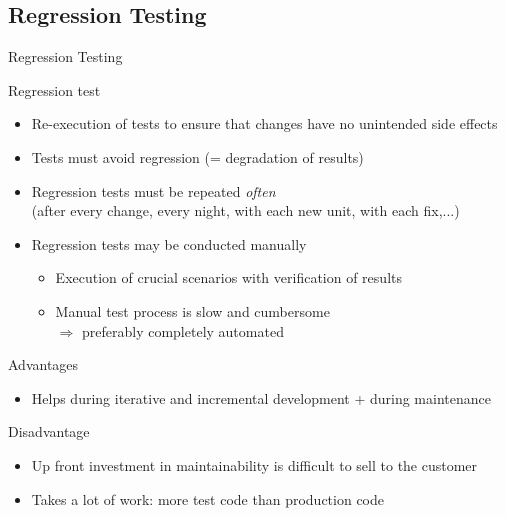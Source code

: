 \subsection{Regression Testing}
\begin{frame}{Regression Testing}
  \begin{block}{Regression test}
    \begin{itemize}
    \item Re-execution of tests to ensure that changes have no unintended side
      effects
    \item Tests must avoid regression (= degradation of results)
    \item Regression tests must be repeated \textit{often}\\
      {\small (after every change, every night, with each new unit, with each fix,...)}
    \item Regression tests may be conducted manually
      \begin{itemize}
      \item Execution of crucial scenarios with verification of results
      \item Manual test process is slow and cumbersome\\
        $\Rightarrow$ preferably completely automated
      \end{itemize}
    \end{itemize}
  \end{block}\vspace{-.5\baselineskip}
  \begin{block}{Advantages}
    \begin{itemize}
    \item Helps during iterative and incremental development + during
      maintenance
    \end{itemize}
  \end{block}\vspace{-.5\baselineskip}
  \begin{block}{Disadvantage}
    \begin{itemize}
    \item Up front investment in maintainability is difficult to sell to the
      customer
    \item Takes a lot of work: more test code than production code
    \end{itemize}
  \end{block}
\end{frame}
